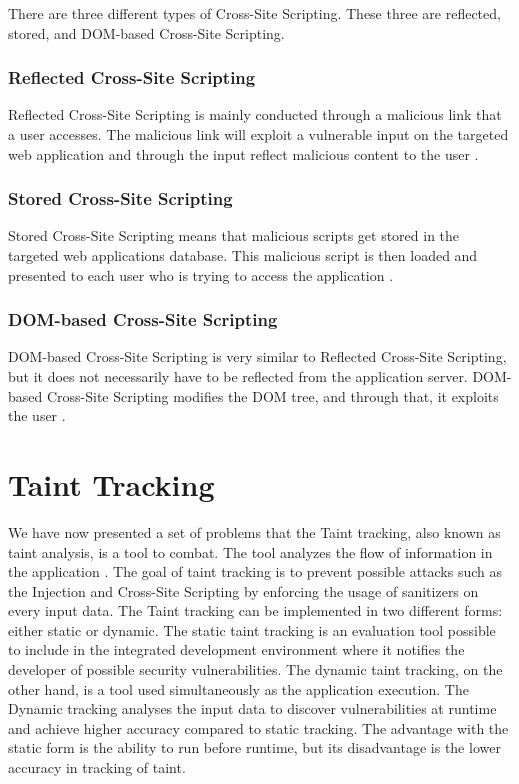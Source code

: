 There are three different types of Cross-Site Scripting. These three are reflected, stored, and DOM-based Cross-Site Scripting.



\subsubsection{Reflected Cross-Site Scripting}
Reflected Cross-Site Scripting is mainly conducted through a malicious link that a user accesses. The malicious link will exploit a vulnerable input on the targeted web application and through the input reflect malicious content to the user \parencite{Secure_Web}.



\subsubsection{Stored Cross-Site Scripting}
Stored Cross-Site Scripting means that malicious scripts get stored in the targeted web applications database. This malicious script is then loaded and presented to each user who is trying to access the application \parencite{Secure_Web}.



\subsubsection{DOM-based Cross-Site Scripting}
DOM-based Cross-Site Scripting is very similar to Reflected Cross-Site Scripting, but it does not necessarily have to be reflected from the application server. DOM-based Cross-Site Scripting modifies the DOM tree, and through that, it exploits the user \parencite{Secure_Web}.



\section{Taint Tracking}
\label{DynamicTaintTracking}
We have now presented a set of problems that the Taint tracking, also known as taint analysis, is a tool to combat. The tool analyzes the flow of information in the application \parencite{Pan2015}. The goal of taint tracking is to prevent possible attacks such as the Injection and Cross-Site Scripting by enforcing the usage of sanitizers on every input data. The Taint tracking can be implemented in two different forms: either static or dynamic. The static taint tracking is an evaluation tool possible to include in the integrated development environment where it notifies the developer of possible security vulnerabilities. The dynamic taint tracking, on the other hand, is a tool used simultaneously as the application execution. The Dynamic tracking analyses the input data to discover vulnerabilities at runtime and achieve higher accuracy compared to static tracking. The advantage with the static form is the ability to run before runtime, but its disadvantage is the lower accuracy in tracking of taint.

